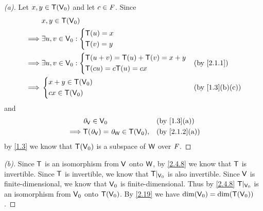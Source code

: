 \begin{proof}[(a)]
  Let \(x, y \in \mathsf{T}(\mathsf{V}_0)\) and let \(c \in \mathit{F}\).
  Since
  \begin{align*}
             & x, y \in \T(\V_0)                                                  \\
    \implies & \exists u, v \in \V_0 : \begin{dcases}
                                         \T(u) = x \\
                                         \T(v) = y
                                       \end{dcases}                              \\
    \implies & \exists u, v \in \V_0 : \begin{dcases}
                                         \T(u + v) = \T(u) + \T(v) = x + y \\
                                         \T(cu) = c \T(u) = cx
                                       \end{dcases} &  & \text{(by \cref{2.1.1})} \\
    \implies & \begin{dcases}
                 x + y \in \T(\V_0) \\
                 cx \in \T(\V_0)
               \end{dcases}                  &  & \text{(by \cref{1.3}(b)(c))}
  \end{align*}
  and
  \begin{align*}
             & \zv_{\V} \in \V_0                     &  & \text{(by \cref{1.3}(a))}   \\
    \implies & \T(\zv_{\V}) = \zv_{\W} \in \T(\V_0), &  & \text{(by \cref{2.1.2}(a))}
  \end{align*}
  by \cref{1.3} we know that \(\mathsf{T}(\mathsf{V}_0)\) is a subspace of \(\mathsf{W}\) over \(\mathit{F}\).
\end{proof}

\begin{proof}[(b)]
  Since \(\mathsf{T}\) is an isomorphism from \(\mathsf{V}\) onto \(\mathsf{W}\), by \cref{2.4.8} we know that \(\mathsf{T}\) is invertible.
  Since \(\mathsf{T}\) is invertible, we know that \(\mathsf{T}|_{\mathsf{V}_0}\) is also invertible.
  Since \(\mathsf{V}\) is finite-dimensional, we know that \(\mathsf{V}_0\) is finite-dimensional.
  Thus by \cref{2.4.8} \(\mathsf{T}|_{\mathsf{V}_0}\) is an isomorphism from \(\mathsf{V}_0\) onto \(\mathsf{T}(\mathsf{V}_0)\).
  By \cref{2.19} we have \(\dim(\mathsf{V}_0) = \dim(\mathsf{T}(\mathsf{V}_0))\).
\end{proof}
